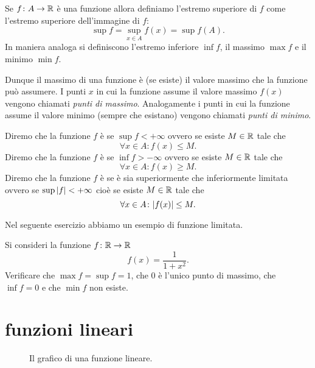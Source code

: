 \begin{definition}
\label{def:funzione_limitata}%
Se $f\colon A \to \mathbb R$ è una funzione allora definiamo
l'estremo superiore di $f$ come l'estremo superiore
dell'immagine di $f$:
\[
  \sup f = \sup_{x\in A} f(x) = \sup f(A).
\]
In maniera analoga si definiscono l'estremo inferiore $\inf f$,
il massimo $\max f$ e il minimo $\min f$.

Dunque il massimo di una funzione è (se esiste) il valore massimo
che la funzione può assumere. I punti $x$ in cui
la funzione assume il valore massimo $f(x)$ vengono chiamati
\emph{punti di massimo}.
%
%
%
Analogamente i punti in cui la funzione
assume il valore minimo (sempre che esistano) vengono
chiamati \emph{punti di minimo}.

Diremo che la funzione $f$ è
se $\sup f<+\infty$
ovvero se esiste $M\in \mathbb R$ tale che
\[
\forall x\in A \colon f(x) \le M.
\]
Diremo che la funzione $f$ è
se $\inf f > -\infty$ ovvero se esiste $M\in \mathbb R$ tale che
\[
 \forall x \in A \colon f(x) \ge M.
\]
Diremo che la funzione $f$ è 
se è sia superiormente che inferiormente limitata ovvero
se $\sup{\left|f\right|}<+\infty$ cioè se esiste $M\in \mathbb R$ tale che
\[
\forall x \in A \colon {\left|f(x)\right|}\le M.
\]
\end{definition}

Nel seguente esercizio abbiamo un esempio di funzione limitata.
\begin{exercise}
Si consideri la funzione $f\colon \mathbb R\to\mathbb R$
\[
 f(x) = \frac{1}{1+x^2}.
\]
Verificare che $\max f = \sup f = 1$, che $0$ è l'unico punto di massimo,
che $\inf f = 0$ e che $\min f$ non esiste.
\end{exercise}

\section{funzioni lineari}

\begin{figure}
  \begin{center}
  \end{center}
  \caption{Il grafico di una funzione lineare.}
  \label{fig:funzione_lineare}
\end{figure}

